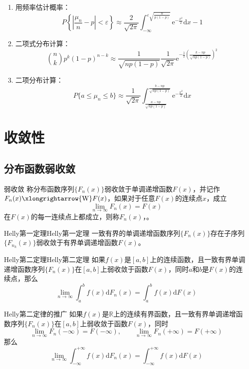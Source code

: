 \documentclass[lang = cn, scheme = chinese, thmcnt = section]{elegantbook}
\newcommand{\R}{\mathbb{R}}            %
\begin{document}
\begin{corollary}
	\begin{enumerate}
		\item 用频率估计概率：
		$$
		P\left\{\left|\frac{\mu_n}{n}-p\right|<\varepsilon\right\}
		\approx\frac{2}{\sqrt{2\pi}}\int_{-\infty}^{\varepsilon\sqrt{\frac{n}{p(1-p)}}}{\mathrm{e}^{-\frac{x^2}{2}}\mathrm{d}x}-1
		$$
		\item 二项式分布计算：
		$$
		{{n}\choose{k}}p^k(1-p)^{n-k}\approx\frac{1}{\sqrt{np(1-p)}}\frac{1}{\sqrt{2\pi}}\mathrm{e}^{-\frac{1}{2}(\frac{k-np}{\sqrt{np(1-p)}})^2}
		$$
		\item 二项分布计算：
		$$
		P\{a\le\mu_n\le b\}\approx\frac{1}{\sqrt{2\pi}}\int_{\frac{a-np}{\sqrt{np(1-p)}}}^{\frac{b-np}{\sqrt{np(1-p)}}}{\mathrm{e}^{-\frac{x^2}{2}}\mathrm{d}x}
		$$
	\end{enumerate}
\end{corollary}

\section{收敛性}

\subsection{分布函数弱收敛}

\begin{definition}{弱收敛}
	称分布函数序列$\{F_n(x)\}$弱收敛于单调递增函数$F(x)$，并记作$F_n(x)\xlongrightarrow{\mathrm{W}}F(x)$，如果对于任意$F(x)$的连续点$x$，成立
	$$
	\lim_{n\to\infty}{F_n(x)}=F(x)
	$$
	在$F(x)$的每一连续点上都成立，则称$F_n(x)$，。
\end{definition}

\begin{theorem}{Helly第一定理}{Helly第一定理}
	一致有界的单调递增函数序列$\{F_n(x)\}$存在子序列$\{F_{n_k}(x)\}$弱收敛于有界单调递增函数$F(x)$。
\end{theorem}

\begin{theorem}{Helly第二定理}{Helly第二定理}
	如果$f(x)$是$[a,b]$上的连续函数，且一致有界单调递增函数序列$\{F_n(x)\}$在$[a,b]$上弱收敛于函数$F(x)$，同时$a$和$b$是$F(x)$的连续点，那么
	$$
	\lim_{n\to\infty}{\int_a^b{f(x)\mathrm{d}F_n(x)}}=\int_a^b{f(x)\mathrm{d}F(x)}
	$$
\end{theorem}

\begin{theorem}{Helly第二定律的推广}
	如果$f(x)$是$\R$上的连续有界函数，且一致有界单调递增函数序列$\{F_n(x)\}$在$[a,b]$上弱收敛于函数$F(x)$，同时
	$$
	\lim_{n\to\infty}{F_n(-\infty)}=F(-\infty),\qquad
	\lim_{n\to\infty}{F_n(+\infty)}=F(+\infty)
	$$
	那么
	$$
	\lim_{n\to\infty}{\int_{-\infty}^{+\infty}{f(x)\mathrm{d}F_n(x)}}=\int_{-\infty}^{+\infty}{f(x)\mathrm{d}F(x)}
	$$
\end{theorem}
\end{document}

